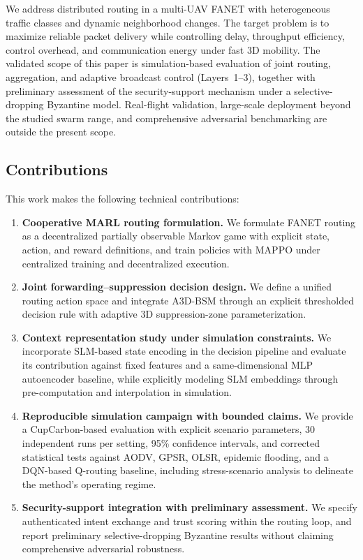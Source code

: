 \documentclass[5p,times]{elsarticle}
\begin{document}
We address distributed routing in a multi-UAV FANET with heterogeneous traffic classes and dynamic neighborhood changes. The target problem is to maximize reliable packet delivery while controlling delay, throughput efficiency, control overhead, and communication energy under fast 3D mobility. The validated scope of this paper is simulation-based evaluation of joint routing, aggregation, and adaptive broadcast control (Layers~1--3), together with preliminary assessment of the security-support mechanism under a selective-dropping Byzantine model. Real-flight validation, large-scale deployment beyond the studied swarm range, and comprehensive adversarial benchmarking are outside the present scope.

\subsection{Contributions}

This work makes the following technical contributions:

\begin{enumerate}
\item \textbf{Cooperative MARL routing formulation.} We formulate FANET routing as a decentralized partially observable Markov game with explicit state, action, and reward definitions, and train policies with MAPPO under centralized training and decentralized execution.

\item \textbf{Joint forwarding--suppression decision design.} We define a unified routing action space and integrate A3D-BSM through an explicit thresholded decision rule with adaptive 3D suppression-zone parameterization.

\item \textbf{Context representation study under simulation constraints.} We incorporate SLM-based state encoding in the decision pipeline and evaluate its contribution against fixed features and a same-dimensional MLP autoencoder baseline, while explicitly modeling SLM embeddings through pre-computation and interpolation in simulation.

\item \textbf{Reproducible simulation campaign with bounded claims.} We provide a CupCarbon-based evaluation with explicit scenario parameters, 30 independent runs per setting, 95\% confidence intervals, and corrected statistical tests against AODV, GPSR, OLSR, epidemic flooding, and a DQN-based Q-routing baseline, including stress-scenario analysis to delineate the method's operating regime.

\item \textbf{Security-support integration with preliminary assessment.} We specify authenticated intent exchange and trust scoring within the routing loop, and report preliminary selective-dropping Byzantine results without claiming comprehensive adversarial robustness.
\end{enumerate}
\end{document}
